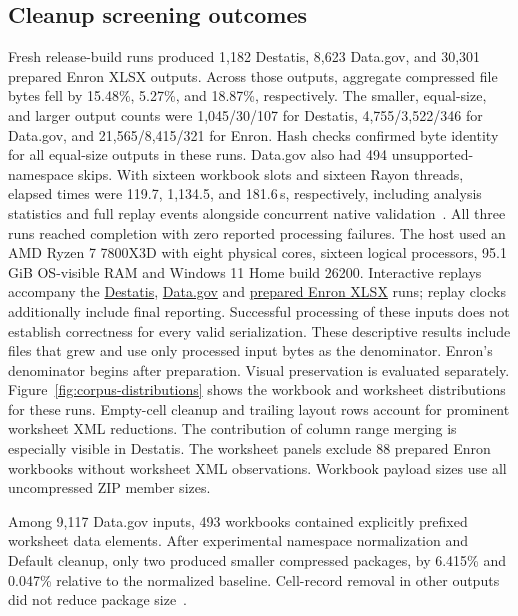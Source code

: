 \subsection{Cleanup screening outcomes}
Fresh release-build runs produced 1,182 Destatis, 8,623 Data.gov, and 30,301
prepared Enron XLSX outputs. Across those outputs, aggregate compressed
file bytes fell by 15.48\%, 5.27\%, and 18.87\%, respectively.
The smaller, equal-size, and larger output counts were
1,045/30/107 for Destatis, 4,755/3,522/346 for Data.gov, and
21,565/8,415/321 for Enron. Hash checks confirmed byte identity for all
equal-size outputs in these runs. Data.gov also had 494 unsupported-namespace
skips. With sixteen workbook slots and sixteen Rayon threads, elapsed times
were 119.7, 1,134.5, and 181.6\,s, respectively, including analysis statistics
and full replay events alongside concurrent native validation~\cite{corpusdistributions}.
All three runs reached completion with zero reported processing failures.
The host used an AMD Ryzen 7 7800X3D with eight physical cores, sixteen logical
processors, 95.1\,GiB OS-visible RAM and Windows 11 Home build 26200.
Interactive replays accompany the
\href{https://alexander-aue-johr.github.io/excel-shrink-paper/replays/corpus-distributions-20261111/destatis/}{Destatis},
\href{https://alexander-aue-johr.github.io/excel-shrink-paper/replays/corpus-distributions-20261111/datagov/}{Data.gov}
and \href{https://alexander-aue-johr.github.io/excel-shrink-paper/replays/corpus-distributions-20261111/enron/}{prepared Enron XLSX}
runs; replay clocks additionally include final reporting.
Successful processing of these inputs does not establish correctness for every
valid serialization.
These descriptive results include files that grew and use only processed
input bytes as the denominator. Enron's denominator begins after
preparation. Visual preservation is evaluated separately.
Figure~\ref{fig:corpus-distributions} shows the workbook and worksheet
distributions for these runs. Empty-cell cleanup and trailing layout rows
account for prominent worksheet XML reductions. The contribution of column
range merging is especially visible in Destatis. The worksheet panels exclude
88 prepared Enron workbooks without worksheet XML observations. Workbook payload sizes use all uncompressed ZIP member sizes.

Among 9,117 Data.gov inputs, 493 workbooks contained explicitly prefixed
worksheet data elements. After experimental namespace normalization and Default
cleanup, only two produced smaller compressed packages, by 6.415\% and 0.047\%
relative to the normalized baseline. Cell-record removal in other outputs did
not reduce package size~\cite{prefixeddataexperiment}.

